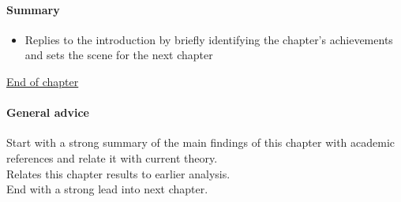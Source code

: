 \documentclass[dissertation]{softeng}
\begin{document}
\paragraph{Summary}
\begin{itemize}
\item Replies to the introduction by briefly identifying the chapter's achievements and sets the scene for the next chapter
\end{itemize}

\noindent\underline{End of chapter}
\paragraph{General advice}
Start with a strong summary of the main findings of this chapter with academic references and relate it with current theory.\\
Relates this chapter results to earlier analysis.\\
End with a strong lead into next chapter.\\

%
%
\printbibliography
\end{document}
